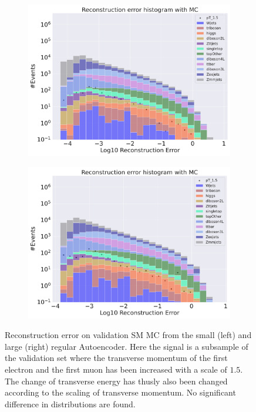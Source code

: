 \begin{figure}[H]
    \centering
    \begin{subfigure}{.45\textwidth}
        \includegraphics[width=\textwidth]{Figures/AE_testing/small/b_data_recon_big_rm3_feats_sig_pT_1.5.pdf}
        \caption{ }
        \label{fig:ae_small_pt_1_5}
    \end{subfigure}
    \hfill 
    \begin{subfigure}{.45\textwidth}
        \includegraphics[width=\textwidth]{Figures/AE_testing/big/b_data_recon_big_rm3_feats_sig_pT_1.5.pdf}
        \caption{ }
        \label{fig:ae_big_pt_1_5}
    \end{subfigure}
    \hfill 
    \caption[AE | Reconstruction error $p_T$ altering of 1.5]{Reconstruction error on validation SM MC from the small (left) and large (right) regular Autoencoder. Here the signal is a subsample of the validation 
    set where the transverse momentum of the first electron and the first muon has been increased with a scale of $1.5$. The change of transverse 
    energy has thusly also been changed according to the scaling of transverse momentum. No significant difference in distributions are found. }
    \label{fig:ae_big_small_pt_1_5}
\end{figure}

